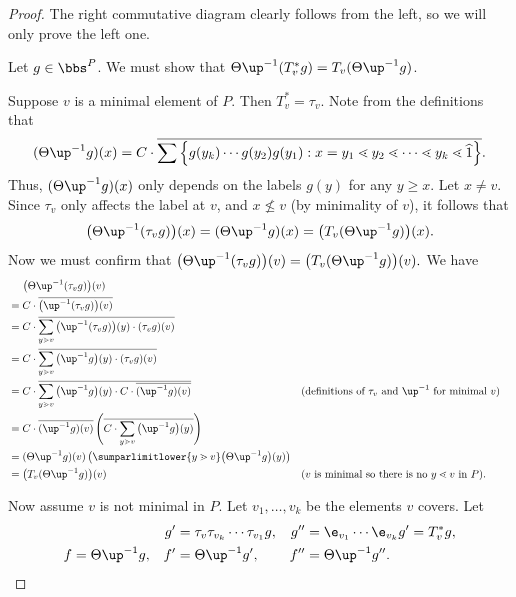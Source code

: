 \begin{proof}
The right commutative diagram clearly follows from the left, so we will only prove the left one.

Let $g\in\bbs^P$. We must show that
$\Theta \up^{-1} (T_v^*g) = T_v(\Theta\up^{-1} g)$.

Suppose $v$ is a minimal element of $P$. Then $T_v^*=\tau_v$. Note from the definitions that 
\[
(\Theta\up^{-1} g)(x) =
C\cdot \overline{\sum\left\{ g(y_k)\cdots g(y_2)g(y_1):
 x=y_1\lessdot y_2 \lessdot \cdots \lessdot y_k\lessdot \widehat{1} \right\}} .
\]
Thus, $(\Theta\up^{-1} g)(x)$ only depends on the labels $g(y)$ for any $y\geq x$.
Let $x\not=v$. Since $\tau_v$ only affects the label at $v$, and $x\not\leq v$ (by minimality of $v$), it follows that 
\[
\big(\Theta\up^{-1} (\tau_v g)\big)(x)=
(\Theta\up^{-1} g)(x)=
\big(T_v(\Theta\up^{-1} g)\big)(x).\]
Now we must confirm that
$\big(\Theta\up^{-1} (\tau_v g)\big)(v)=\big(T_v(\Theta\up^{-1} g)\big)(v).$
We have
\begin{align*}
&\phantom{=l}\big(\Theta\up^{-1} (\tau_v g)\big)(v)\\
&= C\cdot \overline{\big(\up^{-1} (\tau_v g)\big)(v)}\\
&= C\cdot \overline{\sum\limits_{y\gtrdot v}\big(\up^{-1}(\tau_v g)\big)(y)\cdot(\tau_v g)(v)}\\
&= C\cdot \overline{\sum\limits_{y\gtrdot v}\big(\up^{-1}g\big)(y)\cdot(\tau_v g)(v)}\\
&= C\cdot \overline{\sum\limits_{y\gtrdot v}\big(\up^{-1}g\big)(y)\cdot C\cdot\overline{(\up^{-1}g)(v)}}
&&\text{(definitions of $\tau_v$ and $\up^{-1}$ for minimal $v$)}
\\
&=C\cdot \overline{(\up^{-1}g)(v)}\left(\overline{C\cdot \sum\limits_{y\gtrdot v}\big(\up^{-1}g\big)(y)}\right)\\
&=(\Theta\up^{-1}g)(v)\left(\sumparlimitlower{y\gtrdot v}\big(\Theta\up^{-1}g\big)(y)\right)\\
&=\big(T_v(\Theta\up^{-1} g)\big)(v)
&&\text{($v$ is minimal so there is no $y\lessdot v$ in $P$).}
\end{align*}

Now assume $v$ is not minimal in $P$. Let $v_1,\dots,v_k$ be the elements $v$ covers. Let
\begin{align*}
&&g' &= \tau_v\tau_{v_k}\cdots \tau_{v_1} g,
&g'' &= \e_{v_1}\cdots \e_{v_k} g' = T_v^* g,\\
f &= \Theta\up^{-1}g,
&f' &= \Theta\up^{-1}g',
&f'' &= \Theta\up^{-1}g''.\\
\end{align*}


\end{proof}
